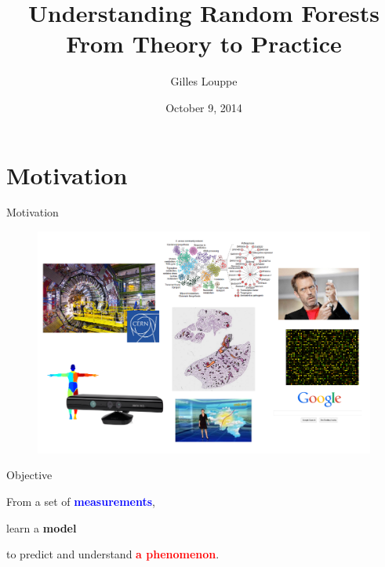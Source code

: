 \documentclass{beamer}
\title{{\bf Understanding Random Forests}\\
From Theory to Practice}
\author{Gilles Louppe}
\institute{Université de Liège, Belgium}
\date{October 9, 2014}
\newcommand{\X}[1]{\textcolor{blue}{#1}}
\newcommand{\y}[1]{\textcolor{red}{#1}}
\newcommand{\model}[1]{\textcolor{mygreen}{#1}}
\begin{document}
\renewcommand{\inserttotalframenumber}{39}


\begin{frame}
\titlepage
\end{frame}





\section{Motivation}

\begin{frame}{Motivation}

\begin{figure}
\vspace{-0.5cm}
\includegraphics[scale=0.4]{./figures/motivation.png}
\end{figure}

\end{frame}

\begin{frame}{Objective}

\begin{center}
From a set of {\bf \X{measurements}},

\vspace{1cm}
learn a {\bf \model{model}}
\vspace{1cm}

to predict and understand {\bf \y{a phenomenon}}.
\end{center}

\end{frame}
\end{document}
